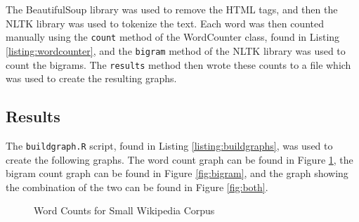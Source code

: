 \clearpage

The BeautifulSoup library \cite{py:beautifulsoup} was used to remove the HTML tags, and then the NLTK library \cite{py:nltk} was used to tokenize the text.  Each word was then counted manually using the \texttt{count} method of the WordCounter class, found in Listing \ref{listing:wordcounter}, and the \texttt{bigram} method of the NLTK library \cite{py:nltk} was used to count the bigrams.  The \texttt{results} method then wrote these counts to a file which was used to create the resulting graphs.



\clearpage

\subsection{Results}
The \texttt{buildgraph.R} script, found in Listing \ref{listing:buildgraphs}, was used to create the following graphs.  The word count graph can be found in Figure \ref{fig:wc}, the bigram count graph can be found in Figure \ref{fig:bigram}, and the graph showing the combination of the two can be found in Figure \ref{fig:both}.

\begin{figure}[h!]
\centering
\label{fig:wc}
\caption{Word Counts for Small Wikipedia Corpus}
\end{figure}

